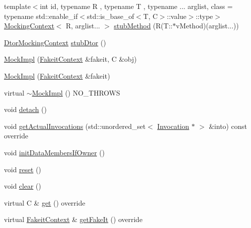 \begin{DoxyCompactItemize}
\item 
{\footnotesize template$<$int id, typename R , typename T , typename ... arglist, class  = typename std\+::enable\+\_\+if$<$std\+::is\+\_\+base\+\_\+of$<$\+T, C$>$\+::value$>$\+::type$>$ }\\\mbox{\hyperlink{classfakeit_1_1MockingContext}{Mocking\+Context}}$<$ R, arglist... $>$ \mbox{\hyperlink{classfakeit_1_1MockImpl_a603befd40e35ea88c7efee965f15bb60}{stub\+Method}} (R(T\+::$\ast$v\+Method)(arglist...))
\item 
\mbox{\hyperlink{classfakeit_1_1DtorMockingContext}{Dtor\+Mocking\+Context}} \mbox{\hyperlink{classfakeit_1_1MockImpl_ae64cb908c91a96faefbf0fabac948f29}{stub\+Dtor}} ()
\item 
\mbox{\hyperlink{classfakeit_1_1MockImpl_aeabb99e36f2ef5fea7856db165fe01d3}{Mock\+Impl}} (\mbox{\hyperlink{structfakeit_1_1FakeitContext}{Fakeit\+Context}} \&fakeit, C \&obj)
\item 
\mbox{\hyperlink{classfakeit_1_1MockImpl_ae6f86001c16b110046453433ba2d36e8}{Mock\+Impl}} (\mbox{\hyperlink{structfakeit_1_1FakeitContext}{Fakeit\+Context}} \&fakeit)
\item 
virtual \mbox{\hyperlink{classfakeit_1_1MockImpl_aafbd9e9c1f6691f7cee440c52ae07220}{$\sim$\+Mock\+Impl}} () N\+O\+\_\+\+T\+H\+R\+O\+WS
\item 
void \mbox{\hyperlink{classfakeit_1_1MockImpl_a48e09b74451cf9c435aab31b077cce26}{detach}} ()
\item 
void \mbox{\hyperlink{classfakeit_1_1MockImpl_a04c3121eb7d380226f1beabf4b18ee82}{get\+Actual\+Invocations}} (std\+::unordered\+\_\+set$<$ \mbox{\hyperlink{structfakeit_1_1Invocation}{Invocation}} $\ast$ $>$ \&into) const override
\item 
void \mbox{\hyperlink{classfakeit_1_1MockImpl_ad403c33f4734e31196ead952fc4c4805}{init\+Data\+Members\+If\+Owner}} ()
\item 
void \mbox{\hyperlink{classfakeit_1_1MockImpl_aad69a9c36fc64d0890f21ff15318a206}{reset}} ()
\item 
void \mbox{\hyperlink{classfakeit_1_1MockImpl_a3985505d2ec7bd50a5d71f155c5ae458}{clear}} ()
\item 
virtual C \& \mbox{\hyperlink{classfakeit_1_1MockImpl_a8f287e857fde9a0941c618ff5459bd88}{get}} () override
\item 
virtual \mbox{\hyperlink{structfakeit_1_1FakeitContext}{Fakeit\+Context}} \& \mbox{\hyperlink{classfakeit_1_1MockImpl_a1b51dd1918a32ec5d450fc804ad37e63}{get\+Fake\+It}} () override
\item 

\end{DoxyCompactItemize}
